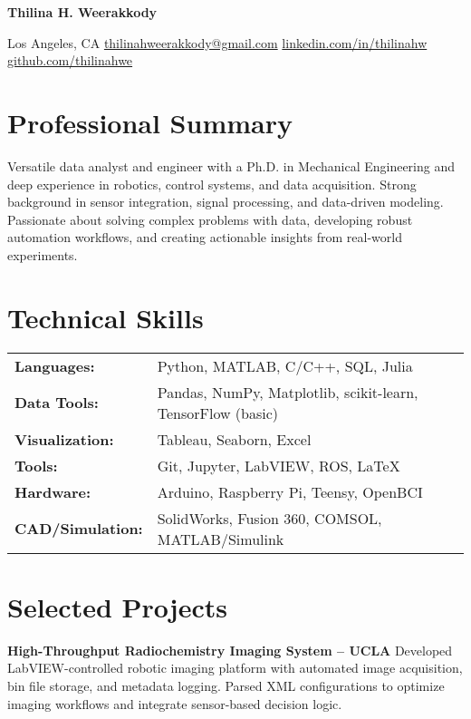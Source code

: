 \documentclass[letterpaper,10pt]{article}
\begin{document}
{\LARGE \textbf{Thilina H. Weerakkody}}

 Los Angeles, CA \quad
{} \href{mailto:thilinahweerakkody@gmail.com}{thilinahweerakkody@gmail.com} \quad
 \href{https://www.linkedin.com/in/thilinahw/}{linkedin.com/in/thilinahw} \quad
{} \href{https://github.com/thilinahwe}{github.com/thilinahwe}

\section*{Professional Summary \hrulefill}
Versatile data analyst and engineer with a Ph.D. in Mechanical Engineering and deep experience in robotics, control systems, and data acquisition. Strong background in sensor integration, signal processing, and data-driven modeling. Passionate about solving complex problems with data, developing robust automation workflows, and creating actionable insights from real-world experiments.

\section*{Technical Skills \hrulefill}

\begin{tabularx}{\textwidth}{p{1.2in} p{4.4in}}
\textbf{Languages:} & Python, MATLAB, C/C++, SQL, Julia \\
\textbf{Data Tools:} & Pandas, NumPy, Matplotlib, scikit-learn, TensorFlow (basic) \\
\textbf{Visualization:} & Tableau, Seaborn, Excel \\
\textbf{Tools:} & Git, Jupyter, LabVIEW, ROS, \LaTeX \\
\textbf{Hardware:} & Arduino, Raspberry Pi, Teensy, OpenBCI \\
\textbf{CAD/Simulation:} & SolidWorks, Fusion 360, COMSOL, MATLAB/Simulink \\
\end{tabularx}

\section*{Selected Projects \hrulefill}
\textbf{High-Throughput Radiochemistry Imaging System – UCLA}  
Developed LabVIEW-controlled robotic imaging platform with automated image acquisition, bin file storage, and metadata logging. Parsed XML configurations to optimize imaging workflows and integrate sensor-based decision logic.
\end{document}
